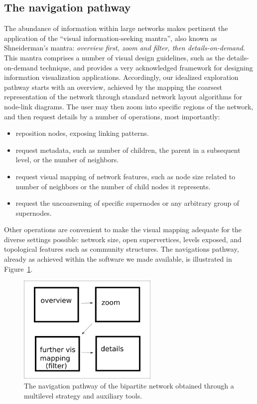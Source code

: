 \documentclass[runningheads]{llncs}
\begin{document}
\subsection{The navigation pathway}\label{nav}
The abundance of information within large networks makes pertinent the
application of
the ``visual information-seeking mantra'', also known as Shneiderman's mantra:
\emph{overview first, zoom and filter, then details-on-demand}.
This mantra comprises a number of visual design guidelines,
such as the details-on-demand technique, and provides
a very acknowledged framework for designing information visualization applications.
Accordingly, our idealized exploration pathway starts with an overview,
achieved by the mapping the coarsest representation of the network through
standard network layout algorithms for node-link diagrams.
The user may then zoom into specific regions of the network, and then request
details by a number of operations, most importantly:
\begin{itemize}
  \item reposition nodes, exposing linking patterns.
  \item request metadata, such as number of children, the parent in a subsequent level, or the number of neighbors.
  \item request visual mapping of network features, such as node size related to number of neighbors or the number of child nodes it represents.
  \item request the uncoarsening of specific supernodes or any arbitrary group of supernodes.
\end{itemize}

Other operations are convenient to make the visual mapping adequate for the diverse settings possible:
network size, open supervertices, levels exposed, and topological features such as community structures.
The navigations pathway, already as achieved within the software we made available, is illustrated in Figure~\ref{fnav}.

\begin{figure}[!h]\centering
 \includegraphics[width=0.6\textwidth]{fnav}
  \caption{The navigation pathway of the bipartite network obtained through a multilevel strategy
  and auxiliary tools.
  }\label{fnav}
\end{figure}
\end{document}

